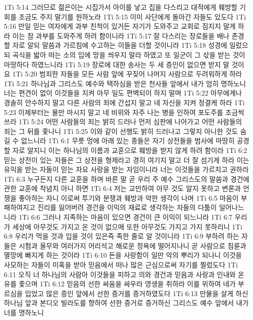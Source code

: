 1Ti 5:14  그러므로 젊은이는 시집가서 아이를 낳고 집을 다스리고 대적에게 훼방할 기회를 조금도 주지 말기를 원하노라
1Ti 5:15  이미 사단에게 돌아간 자들도 있도다
1Ti 5:16  만일 믿는 여자에게 과부 친척이 있거든 자기가 도와주고 교회로 짐지지 말게 하라 이는 참 과부를 도와주게 하려 함이니라
1Ti 5:17  잘 다스리는 장로들을 배나 존경할 자로 알되 말씀과 가르침에 수고하는 이들을 더할 것이니라
1Ti 5:18  성경에 일렀으되 곡식을 밟아 떠는 소의 입에 망을 씌우지 말라 하였고 또 일군이 그 삯을 받는 것이 마땅하다 하였느니라
1Ti 5:19  장로에 대한 송사는 두 세 증인이 없으면 받지 말 것이요
1Ti 5:20  범죄한 자들을 모든 사람 앞에 꾸짖어 나머지 사람으로 두려워하게 하라
1Ti 5:21  하나님과 그리스도 예수와 택하심을 받은 천사들 앞에서 내가 엄히 명하노니 너는 편견이 없이 이것들을 지켜 아무 일도 편벽되이 하지 말며
1Ti 5:22  아무에게나 경솔히 안수하지 말고 다른 사람의 죄에 간섭지 말고 네 자신을 지켜 정결케 하라
1Ti 5:23  이제부터는 물만 마시지 말고 네 비위와 자주 나는 병을 인하여 포도주를 조금씩 쓰라
1Ti 5:24  어떤 사람들의 죄는 밝히 드러나 먼저 심판에 나아가고 어떤 사람들의 죄는 그 뒤를 좇나니
1Ti 5:25  이와 같이 선행도 밝히 드러나고 그렇지 아니한 것도 숨길 수 없느니라
1Ti 6:1  무릇 멍에 아래 있는 종들은 자기 상전들을 범사에 마땅히 공경할 자로 알지니 이는 하나님의 이름과 교훈으로 훼방을 받지 않게 하려 함이라
1Ti 6:2  믿는 상전이 있는 자들은 그 상전을 형제라고 경히 여기지 말고 더 잘 섬기게 하라 이는 유익을 받는 자들이 믿는 자요 사랑을 받는 자임이니라 너는 이것들을 가르치고 권하라
1Ti 6:3  누구든지 다른 교훈을 하며 바른 말 곧 우리 주 예수 그리스도의 말씀과 경건에 관한 교훈에 착념치 아니 하면
1Ti 6:4  저는 교만하여 아무 것도 알지 못하고 변론과 언쟁을 좋아하는 자니 이로써 투기와 분쟁과 훼방과 악한 생각이 나며
1Ti 6:5  마음이 부패하여지고 진리를 잃어버려 경건을 이익의 재료로 생각하는 자들의 다툼이 일어나느니라
1Ti 6:6  그러나 지족하는 마음이 있으면 경건이 큰 이익이 되느니라
1Ti 6:7  우리가 세상에 아무것도 가지고 온 것이 없으매 또한 아무것도 가지고 가지 못하리니
1Ti 6:8  우리가 먹을 것과 입을 것이 있은즉 족한 줄로 알 것이니라
1Ti 6:9  부하려 하는 자들은 시험과 올무와 여러가지 어리석고 해로운 정욕에 떨어지나니 곧 사람으로 침륜과 멸망에 빠지게 하는 것이라
1Ti 6:10  돈을 사랑함이 일만 악의 뿌리가 되나니 이것을 사모하는 자들이 미혹을 받아 믿음에서 떠나 많은 근심으로써 자기를 찔렀도다
1Ti 6:11  오직 너 하나님의 사람아 이것들을 피하고 의와 경건과 믿음과 사랑과 인내와 온유를 좇으며
1Ti 6:12  믿음의 선한 싸움을 싸우라 영생을 취하라 이를 위하여 네가 부르심을 입었고 많은 증인 앞에서 선한 증거를 증거하였도다
1Ti 6:13  만물을 살게 하신 하나님 앞과 본디오 빌라도를 향하여 선한 증거로 증거하신 그리스도 예수 앞에서 내가 너를 명하노니
